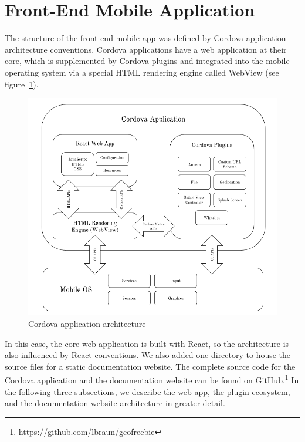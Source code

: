 \section{Front-End Mobile Application}
\label{sec:frontend_architecture}

The structure of the front-end mobile app was defined by Cordova application architecture conventions. Cordova applications have a web application at their core, which is supplemented by Cordova plugins and integrated into the mobile operating system via a special HTML rendering engine called WebView (see figure~\ref{fig:cordova_architecture}).

\begin{figure}[ht]
  \centering
  \includegraphics[scale=0.5]{images/cordova_architecture.png}
  \caption{Cordova application architecture}
  \label{fig:cordova_architecture}
\end{figure}

In this case, the core web application is built with React, so the architecture is also influenced by React conventions. We also added one directory to house the source files for a static documentation website. The complete source code for the Cordova application and the documentation website can be found on GitHub.\footnote{\url{https://github.com/lbraun/geofreebie}} In the following three subsections, we describe the web app, the plugin ecosystem, and the documentation website architecture in greater detail.

